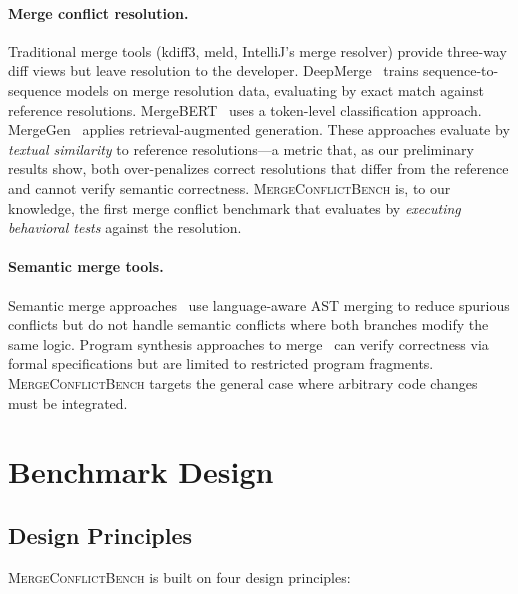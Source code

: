 \documentclass[11pt,a4paper]{article}
\begin{document}
\paragraph{Merge conflict resolution.} Traditional merge tools (kdiff3, meld, IntelliJ's merge resolver) provide three-way diff views but leave resolution to the developer. DeepMerge~\citep{dinella2022deepmerge} trains sequence-to-sequence models on merge resolution data, evaluating by exact match against reference resolutions. MergeBERT~\citep{svyatkovskiy2022mergebert} uses a token-level classification approach. MergeGen~\citep{zhang2024mergegen} applies retrieval-augmented generation. These approaches evaluate by \emph{textual similarity} to reference resolutions---a metric that, as our preliminary results show, both over-penalizes correct resolutions that differ from the reference and cannot verify semantic correctness. \textsc{MergeConflictBench} is, to our knowledge, the first merge conflict benchmark that evaluates by \emph{executing behavioral tests} against the resolution.

\paragraph{Semantic merge tools.} Semantic merge approaches~\citep{apel2011semistructured} use language-aware AST merging to reduce spurious conflicts but do not handle semantic conflicts where both branches modify the same logic. Program synthesis approaches to merge~\citep{sousa2018verified} can verify correctness via formal specifications but are limited to restricted program fragments. \textsc{MergeConflictBench} targets the general case where arbitrary code changes must be integrated.

\section{Benchmark Design}
\label{sec:design}

\subsection{Design Principles}

\textsc{MergeConflictBench} is built on four design principles:
\end{document}

